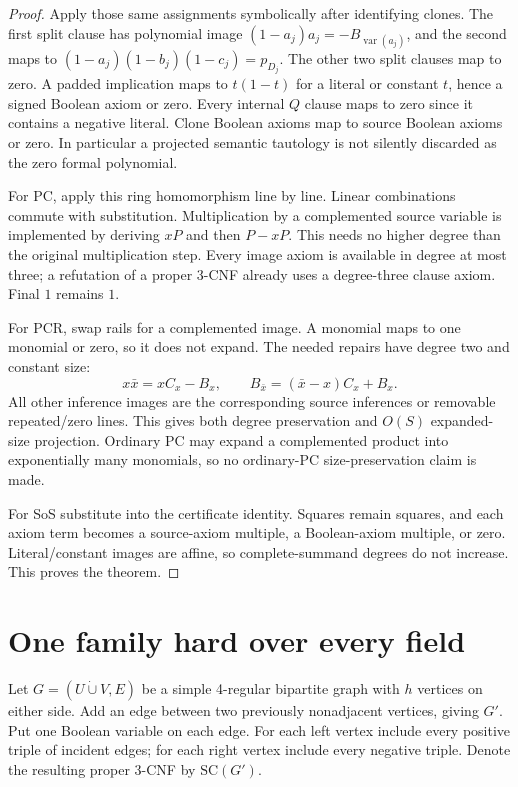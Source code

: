 \documentclass[11pt]{article}
\begin{document}
\begin{proof}
Apply those same assignments symbolically after identifying clones. The first split clause has polynomial image $(1-a_j)a_j=-B_{\operatorname{var}(a_j)}$, and the second maps to $(1-a_j)(1-b_j)(1-c_j)=p_{D_j}$. The other two split clauses map to zero. A padded implication maps to $t(1-t)$ for a literal or constant $t$, hence a signed Boolean axiom or zero. Every internal $Q$ clause maps to zero since it contains a negative literal. Clone Boolean axioms map to source Boolean axioms or zero. In particular a projected semantic tautology is not silently discarded as the zero formal polynomial.

For PC, apply this ring homomorphism line by line. Linear combinations commute with substitution. Multiplication by a complemented source variable is implemented by deriving $xP$ and then $P-xP$. This needs no higher degree than the original multiplication step. Every image axiom is available in degree at most three; a refutation of a proper 3-CNF already uses a degree-three clause axiom. Final $1$ remains $1$.

For PCR, swap rails for a complemented image. A monomial maps to one monomial or zero, so it does not expand. The needed repairs have degree two and constant size:
\[
 x\bar x=xC_x-B_x,\qquad
 B_{\bar x}=(\bar x-x)C_x+B_x.
\]
All other inference images are the corresponding source inferences or removable repeated/zero lines. This gives both degree preservation and $O(S)$ expanded-size projection. Ordinary PC may expand a complemented product into exponentially many monomials, so no ordinary-PC size-preservation claim is made.

For SoS substitute into the certificate identity. Squares remain squares, and each axiom term becomes a source-axiom multiple, a Boolean-axiom multiple, or zero. Literal/constant images are affine, so complete-summand degrees do not increase. This proves the theorem.
\end{proof}

\section{One family hard over every field}
Let $G=(U\mathbin{\dot\cup}V,E)$ be a simple 4-regular bipartite graph with $h$ vertices on either side. Add an edge between two previously nonadjacent vertices, giving $G'$. Put one Boolean variable on each edge. For each left vertex include every positive triple of incident edges; for each right vertex include every negative triple. Denote the resulting proper 3-CNF by $\mathrm{SC}(G')$.
\end{document}
